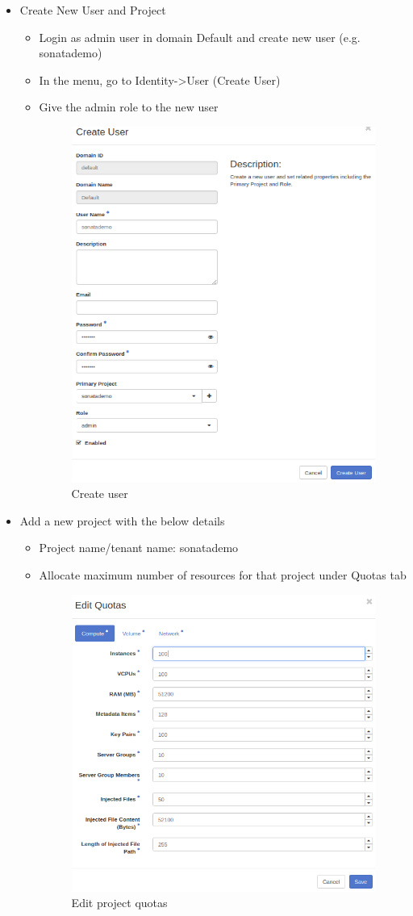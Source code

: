 	\begin{itemize}
		\item Create New User and Project
		\begin{itemize}
			\item Login as admin user in domain Default and create new user (e.g. sonatademo)
			\item In the menu, go to Identity->User (Create User)
			\item Give the admin role to the new user
			\begin{figure}[h]
				\centering
				\includegraphics[width=0.6\linewidth]{figures/CreatingUser}
				\caption{Create user}
				\label{fig:creatinguser}
			\end{figure}
			\newpage
		\end{itemize}
		\item Add a new project with the below details
		\begin{itemize}
			\item Project name/tenant name: sonatademo
			\item Allocate maximum number of resources for that project under Quotas tab
			\begin{figure} [h]
				\centering
				\includegraphics[width=0.5\linewidth]{figures/ProjectQuotas}
				\caption{Edit project quotas}
				\label{fig:projectquotas}
			\end{figure}
			

\end{itemize}
\end{itemize}
